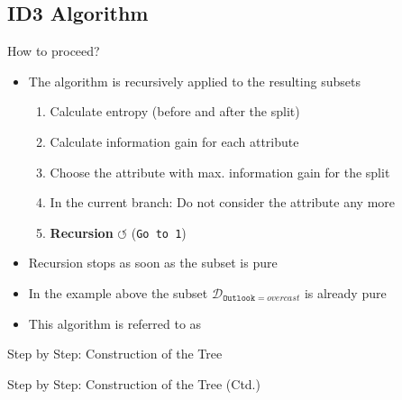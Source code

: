 \subsection{ID3 Algorithm}

\begin{frame}{How to proceed?}{}\important
	\begin{itemize}
		\item The algorithm is recursively applied to the resulting subsets
		\begin{enumerate}
			\item Calculate entropy (before and after the split)
			\item Calculate information gain for each attribute 
			\item Choose the attribute with max. information gain for the split
			\item In the current branch: Do not consider the attribute any more
			\item \textbf{Recursion} $\bm{\circlearrowleft}$ (\texttt{Go to 1})
		\end{enumerate}
		\item Recursion stops as soon as the subset is pure
		\item In the example above the subset $\mathcal{D}_{\texttt{Outlook}=overcast}$ is already pure
		\item This algorithm is referred to as 
	\end{itemize}
\end{frame}


\begin{frame}{Step by Step: Construction of the Tree}{}
	
\end{frame}


\begin{frame}{Step by Step: Construction of the Tree (Ctd.)}{}
	
\end{frame}


